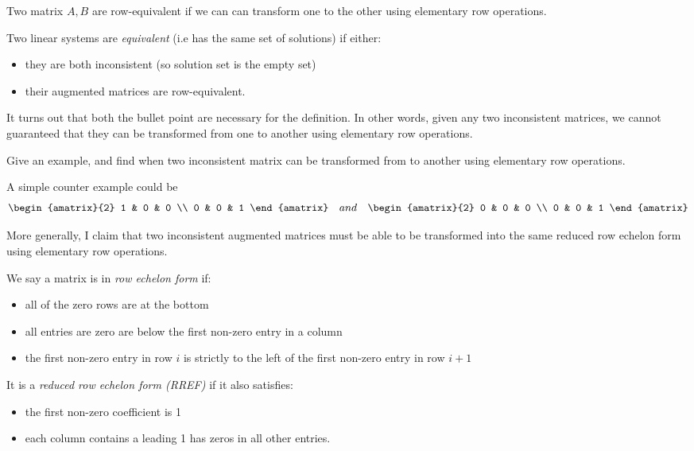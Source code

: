 \documentclass[11pt]{article}
\begin{document}
\begin{definition}
  Two matrix \(A,B\) are row-equivalent if we can can transform one to the other using elementary row operations.
\end{definition}

\begin{definition}[Equivalence]
  Two linear systems are \emph{equivalent} (i.e has the same set of solutions) if either:
  \begin{itemize}
    \item they are both inconsistent (so solution set is the empty set)
    \item their augmented matrices are row-equivalent.
  \end{itemize}
\end{definition}

\begin{problem}
  It turns out that both the bullet point are necessary for the definition. In other words, given any two inconsistent matrices, we cannot guaranteed that they can be transformed from one to another using elementary row operations.

  Give an example, and find when two inconsistent matrix can be transformed from to another using elementary row operations.
\end{problem}
\begin{solution}
  A simple counter example could be
  \begin{align*}
    &\begin{amatrix}{2}
      1 & 0 & 0 \\
      0 & 0 & 1
    \end{amatrix} & and &
    &\begin{amatrix}{2}
      0 & 0 & 0 \\
      0 & 0 & 1
    \end{amatrix}
  \end{align*}

  More generally, I claim that two inconsistent augmented matrices must be able to be transformed into the same reduced row echelon form using elementary row operations.
\end{solution}

\begin{definition}
  We say a matrix is in \emph{row echelon form} if:
  \begin{itemize}
    \item all of the zero rows are at the bottom
    \item all entries are zero are below the first non-zero entry in a column
    \item the first non-zero entry in row \(i\) is strictly to the left of the first non-zero entry in row \(i+1\) 
  \end{itemize}
  It is a \emph{reduced row echelon form (RREF)} if it also satisfies:
  \begin{itemize}
    \item the first non-zero coefficient is 1
    \item each column contains a leading 1 has zeros in all other entries.
  \end{itemize}
\end{definition}
\end{document}
